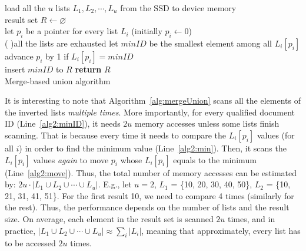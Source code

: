  \begin{algorithm}[htbp]\small

load all the $u$ lists $L_1, L_2, \cdots, L_u$ from the SSD to device memory\\
result set $R \leftarrow \varnothing$\\
let $p_i$ be a pointer for every list $L_i$ (initially $p_i \leftarrow 0$)\\
\Repeat( ){all the lists are exhausted}{
 let $minID$ be the smallest element among all $L_i[p_i]$\\
 advance $p_i$ by 1 if $L_i[p_i] = minID$\\
 insert $minID$ to $R$
 }
 \textbf{return} $R$\\
 \caption{Merge-based union algorithm}\label{alg:mergeUnion}
 \end{algorithm}


It is interesting to note that Algorithm~\ref{alg:mergeUnion} scans all the elements of the inverted lists \emph{multiple times}. More importantly, for every qualified document ID (Line~\ref{alg2:minID}), it needs $2u$ memory accesses unless some lists finish scanning. That is because every time it needs to compare the $L_i[p_i]$ values (for all $i$) in order to find the minimum value (Line~\ref{alg2:min}). Then, it scans the $L_i[p_i]$ values \emph{again} to move $p_i$ whose $L_i[p_i]$ equals to the minimum (Line~\ref{alg2:move}). Thus, the total number of memory accesses can be estimated by: $2u\cdot |L_1 \cup L_2 \cup \cdots \cup L_u|$. E.g., let $u=2$, $L_1$ = \{10, 20, 30, 40, 50\}, $L_2$ = \{10, 21, 31, 41, 51\}. For the first result 10, we need to compare 4 times (similarly for the rest).
Thus, the performance depends on the number of lists and the result size. On average, each element in the result set is scanned $2u$ times, and in practice, $|L_1 \cup L_2 \cup \cdots \cup L_u| \approx \sum_i|L_i|$, meaning that approximately, every list has to be accessed $2u$ times.



